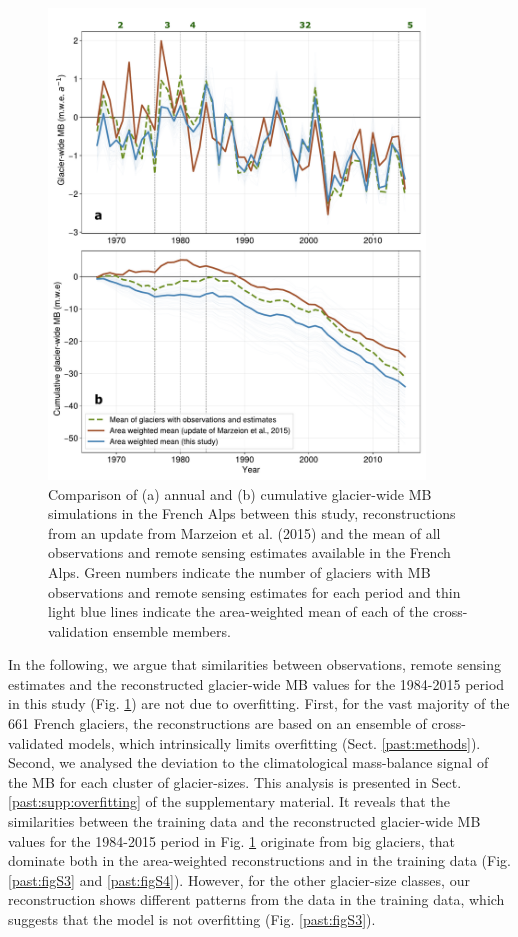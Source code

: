 \begin{figure}[t]
\centering
\includegraphics[width=10cm]{Figures/past/Figure_6.pdf}
\captionsetup{justification=centering}
\caption{Comparison of (a) annual and (b) cumulative glacier-wide MB simulations in the French Alps between this study, reconstructions from an update from Marzeion et al. (2015) and the mean of all observations and remote sensing estimates available in the French Alps. Green numbers indicate the number of glaciers with MB observations and remote sensing estimates for each period and thin light blue lines indicate the area-weighted mean of each of the cross-validation ensemble members.}
\label{past:fig6}
\end{figure}

In the following, we argue that similarities between observations, remote sensing estimates and the reconstructed glacier-wide MB values for the 1984-2015 period in this study (Fig. \ref{past:fig6}) are not due to overfitting. First, for the vast majority of the 661 French glaciers, the reconstructions are based on an ensemble of cross-validated models, which intrinsically limits overfitting (Sect. \ref{past:methods}).  Second, we analysed the deviation to the climatological mass-balance signal of the MB for each cluster of glacier-sizes. This analysis is presented in Sect. \ref{past:supp:overfitting} of the supplementary material. It reveals that the similarities between the training data and the reconstructed glacier-wide MB values for the 1984-2015 period in Fig. \ref{past:fig6} originate from big glaciers, that dominate both in the area-weighted reconstructions and in the training data (Fig. \ref{past:figS3} and \ref{past:figS4}). However, for the other glacier-size classes, our reconstruction shows different patterns from the data in the training data, which suggests that the model is not overfitting (Fig. \ref{past:figS3}). 


